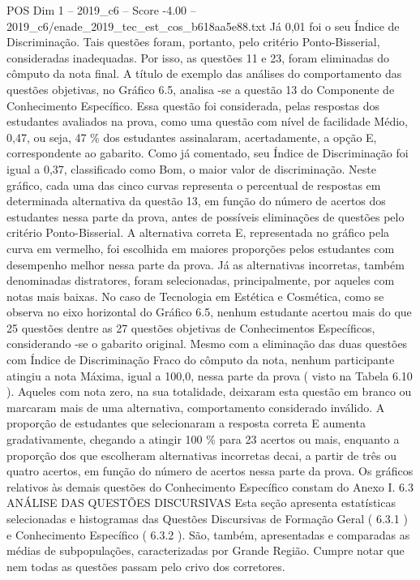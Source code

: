 \begin{textsample}{POS Dim 1 – 2019\_c6 – Score -4.00 – 2019\_c6/enade\_2019\_tec\_est\_cos\_b618aa5e88.txt}
Já 0,01 foi o seu Índice de Discriminação.
Tais questões foram, portanto, pelo critério Ponto-Bisserial, consideradas inadequadas.
Por isso, as questões 11 e 23, foram eliminadas do cômputo da nota final.
A título de exemplo das análises do comportamento das questões objetivas, no Gráfico 6.5, analisa -se a questão 13 do Componente de Conhecimento Específico.
Essa questão foi considerada, pelas respostas dos estudantes avaliados na prova, como uma questão com nível de facilidade Médio, 0,47, ou seja, 47 \% dos estudantes assinalaram, acertadamente, a opção E, correspondente ao gabarito.
Como já comentado, seu Índice de Discriminação foi igual a 0,37, classificado como Bom, o maior valor de discriminação.
Neste gráfico, cada uma das cinco curvas representa o percentual de respostas em determinada alternativa da questão 13, em função do número de acertos dos estudantes nessa parte da prova, antes de possíveis eliminações de questões pelo critério Ponto-Bisserial.
A alternativa correta E, representada no gráfico pela curva em vermelho, foi escolhida em maiores proporções pelos estudantes com desempenho melhor nessa parte da prova.
Já as alternativas incorretas, também denominadas distratores, foram selecionadas, principalmente, por aqueles com notas mais baixas.
No caso de Tecnologia em Estética e Cosmética, como se observa no eixo horizontal do Gráfico 6.5, nenhum estudante acertou mais do que 25 questões dentre as 27 questões objetivas de Conhecimentos Específicos, considerando -se o gabarito original.
Mesmo com a eliminação das duas questões com Índice de Discriminação Fraco do cômputo da nota, nenhum participante atingiu a nota Máxima, igual a 100,0, nessa parte da prova ( visto na Tabela 6.10 ).
Aqueles com nota zero, na sua totalidade, deixaram esta questão em branco ou marcaram mais de uma alternativa, comportamento considerado inválido.
A proporção de estudantes que selecionaram a resposta correta E aumenta gradativamente, chegando a atingir 100 \% para 23 acertos ou mais, enquanto a proporção dos que escolheram alternativas incorretas decai, a partir de três ou quatro acertos, em função do número de acertos nessa parte da prova.
Os gráficos relativos às demais questões do Conhecimento Específico constam do Anexo I. 6.3 ANÁLISE DAS QUESTÕES DISCURSIVAS Esta seção apresenta estatísticas selecionadas e histogramas das Questões Discursivas de Formação Geral ( 6.3.1 ) e Conhecimento Específico ( 6.3.2 ).
São, também, apresentadas e comparadas as médias de subpopulações, caracterizadas por Grande Região.
Cumpre notar que nem todas as questões passam pelo crivo dos corretores.

\end{textsample}
